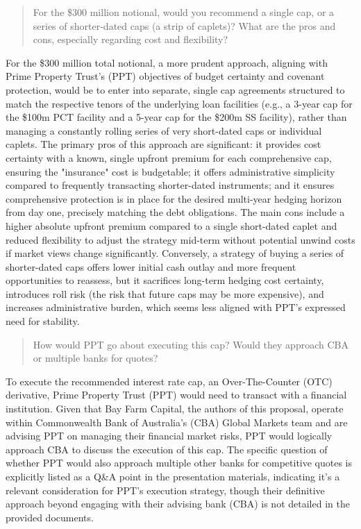 \documentclass[11pt, a4paper, british]{article}
\begin{document}
\newpage

\begin{quote}
    For the \$300 million notional, would you recommend a single cap, or a series of shorter-dated caps (a strip of caplets)? What are the pros and cons, especially regarding cost and flexibility?
\end{quote}

For the \$300 million total notional, a more prudent approach, aligning with Prime Property Trust's (PPT) objectives of budget certainty and covenant protection, would be to enter into separate, single cap agreements structured to match the respective tenors of the underlying loan facilities (e.g., a 3-year cap for the \$100m PCT facility and a 5-year cap for the \$200m SS facility), rather than managing a constantly rolling series of very short-dated caps or individual caplets. The primary pros of this approach are significant: it provides cost certainty with a known, single upfront premium for each comprehensive cap, ensuring the "insurance" cost is budgetable; it offers administrative simplicity compared to frequently transacting shorter-dated instruments; and it ensures comprehensive protection is in place for the desired multi-year hedging horizon from day one, precisely matching the debt obligations. The main cons include a higher absolute upfront premium compared to a single short-dated caplet and reduced flexibility to adjust the strategy mid-term without potential unwind costs if market views change significantly. Conversely, a strategy of buying a series of shorter-dated caps offers lower initial cash outlay and more frequent opportunities to reassess, but it sacrifices long-term hedging cost certainty, introduces roll risk (the risk that future caps may be more expensive), and increases administrative burden, which seems less aligned with PPT's expressed need for stability.

\newpage

\begin{quote}
    How would PPT go about executing this cap? Would they approach CBA or multiple banks for quotes?
\end{quote}

To execute the recommended interest rate cap, an Over-The-Counter (OTC) derivative, Prime Property Trust (PPT) would need to transact with a financial institution. Given that Bay Farm Capital, the authors of this proposal, operate within Commonwealth Bank of Australia's (CBA) Global Markets team and are advising PPT on managing their financial market risks, PPT would logically approach CBA to discuss the execution of this cap. The specific question of whether PPT would also approach multiple other banks for competitive quotes is explicitly listed as a Q\&A point in the presentation materials, indicating it's a relevant consideration for PPT's execution strategy, though their definitive approach beyond engaging with their advising bank (CBA) is not detailed in the provided documents.
\end{document}
